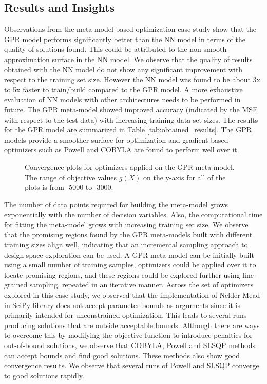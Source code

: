 \subsection{Results and Insights}
Observations from the meta-model based optimization case study show that the GPR model performs significantly better than the NN model in terms of the quality of solutions found. This could be attributed to the non-smooth approximation surface in the NN model. We observe that the quality of results obtained with the NN model do not show any significant improvement with respect to the training set size. However the NN model was found to be about 3x to 5x faster to train/build compared to the GPR model. A more exhaustive evaluation of NN models with other architectures needs to be performed in future. The GPR meta-model showed improved accuracy (indicated by the MSE with respect to the test data) with increasing training data-set sizes. The results for the GPR model are summarized in Table \ref{tab:obtained_results}. The GPR models provide a smoother surface for optimization and gradient-based optimizers such as Powell and COBYLA are found to perform well over it. 
%
\begin{figure}[!h]
  \vspace{-0.2cm}
  \centering
   {}
  \caption{Convergence plots for optimizers applied on the GPR meta-model.   The range of objective values $g(X)$ on the y-axis for all of the plots is from -5000 to -3000.}
  \label{fig:convergence_plots}
\end{figure}

The number of data points required for building the meta-model grows exponentially with the number of decision variables. Also, the computational time for fitting the meta-model grows with increasing training set size. We observe that the promising regions found by the GPR meta-models built with different training sizes align well, indicating that an incremental sampling approach to design space exploration can be used. A GPR meta-model can be initially built using a small number of training samples, optimizers could be applied over it to locate promising regions, and these regions could be explored further using fine-grained sampling, repeated in an iterative manner. 
%
Across the set of optimizers explored in this case study, we observed that the implementation of Nelder Mead in SciPy library does not accept parameter bounds as arguments since it is primarily intended for unconstrained optimization. This leads to several runs producing solutions that are outside acceptable bounds. Although there are ways to overcome this by modifying the objective function to introduce penalties for out-of-bound solutions, we observe that COBYLA, Powell and SLSQP methods can accept bounds and find good solutions.  These methods also show good convergence results. We observe that several runs of Powell and SLSQP converge to good solutions rapidly. 


